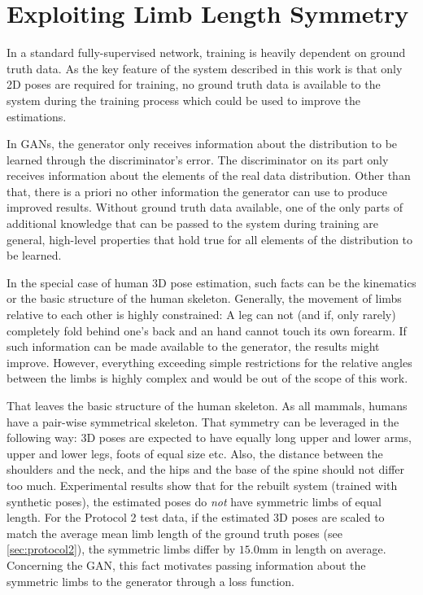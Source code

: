 \section{Exploiting Limb Length Symmetry}
\label{sec:loss-function-modification}

In a standard fully-supervised network, training is heavily dependent on ground truth data.
As the key feature of the system described in this work is that only 2D poses are required for training, no ground truth data is available to the system during the training process which could be used to improve the estimations.

In GANs, the generator only receives information about the distribution to be learned through the discriminator's error.
The discriminator on its part only receives information about the elements of the real data distribution.
Other than that, there is a priori no other information the generator can use to produce improved results.
Without ground truth data available, one of the only parts of additional knowledge that can be passed to the system during training are general, high-level properties that hold true for all elements of the distribution to be learned.

In the special case of human 3D pose estimation, such facts can be the kinematics or the basic structure of the human skeleton.
Generally, the movement of limbs relative to each other is highly constrained:
A leg can not (and if, only rarely) completely fold behind one's back and an hand cannot touch its own forearm.
If such information can be made available to the generator, the results might improve.
However, everything exceeding simple restrictions for the relative angles between the limbs is highly complex and would be out of the scope of this work.

That leaves the basic structure of the human skeleton.
As all mammals, humans have a pair-wise symmetrical skeleton.
That symmetry can be leveraged in the following way:
3D poses are expected to have equally long upper and lower arms, upper and lower legs, foots of equal size etc.
Also, the distance between the shoulders and the neck, and the hips and the base of the spine should not differ too much.
Experimental results show that for the rebuilt system (trained with synthetic poses), the estimated poses do \emph{not} have symmetric limbs of equal length.
For the Protocol 2 test data, if the estimated 3D poses are scaled to match the average mean limb length of the ground truth poses (see \autoref{sec:protocol2}), the symmetric limbs differ by $15.0$mm in length on average.
Concerning the GAN, this fact motivates passing information about the symmetric limbs to the generator through a loss function.


